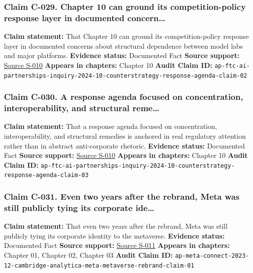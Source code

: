 \documentclass[
  american,
  11pt,
  letterpaper,
]{article}
\begin{document}
\subsubsection{Claim C-029. Chapter 10 can ground its competition-policy
response layer in documented
concern\ldots{}}\label{claim-c-029-chapter-10-can-ground-its-competition-policy-response-layer-in-documented-concern}

\textbf{Claim statement:} That Chapter 10 can ground its
competition-policy response layer in documented concerns about
structural dependence between model labs and major platforms.
\textbf{Evidence status:} Documented Fact \textbf{Source support:}
\hyperref[source-s-010-ftc-opens-inquiry-into-big-tech-s-partnerships-with-leading-ai-startups]{Source
S-010} \textbf{Appears in chapters:} Chapter 10 \textbf{Audit Claim ID:}
\texttt{ap-ftc-ai-partnerships-inquiry-2024-10-counterstrategy-response-agenda-claim-02}

\subsubsection{Claim C-030. A response agenda focused on concentration,
interoperability, and structural
reme\ldots{}}\label{claim-c-030-a-response-agenda-focused-on-concentration-interoperability-and-structural-reme}

\textbf{Claim statement:} That a response agenda focused on
concentration, interoperability, and structural remedies is anchored in
real regulatory attention rather than in abstract anti-corporate
rhetoric. \textbf{Evidence status:} Documented Fact \textbf{Source
support:}
\hyperref[source-s-010-ftc-opens-inquiry-into-big-tech-s-partnerships-with-leading-ai-startups]{Source
S-010} \textbf{Appears in chapters:} Chapter 10 \textbf{Audit Claim ID:}
\texttt{ap-ftc-ai-partnerships-inquiry-2024-10-counterstrategy-response-agenda-claim-03}

\subsubsection{Claim C-031. Even two years after the rebrand, Meta was
still publicly tying its corporate
ide\ldots{}}\label{claim-c-031-even-two-years-after-the-rebrand-meta-was-still-publicly-tying-its-corporate-ide}

\textbf{Claim statement:} That even two years after the rebrand, Meta
was still publicly tying its corporate identity to the metaverse.
\textbf{Evidence status:} Documented Fact \textbf{Source support:}
\hyperref[source-s-011-meta-ceo-mark-zuckerberg-kicks-off-developer-conference-with-focus-on-ai-virtual-reality]{Source
S-011} \textbf{Appears in chapters:} Chapter 01, Chapter 02, Chapter 03
\textbf{Audit Claim ID:}
\texttt{ap-meta-connect-2023-12-cambridge-analytica-meta-metaverse-rebrand-claim-01}
\end{document}
